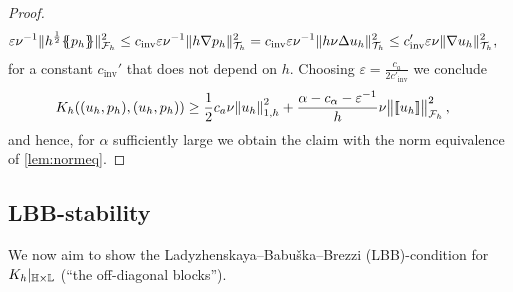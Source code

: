 \documentclass[pdflatex,sn-mathphys,Numbered]{sn-jnl}%
\theoremstyle{remark}%
\theoremstyle{definition}%
\begin{document}
\begin{proof}
\begin{align*}
    \varepsilon \nu^{-1} \Vert h^{\frac12} \{\!\!\{ p_h\}\!\!\} \Vert_{{\mathcal{F}_h}}^2  &\leq c_{\text{inv}} \varepsilon \nu^{-1} \Vert  h \nabla p_h \Vert_{{\mathcal{T}_h}}^2 = c_{\text{inv}} \varepsilon \nu^{-1}  \Vert  h \nu \Delta u_h \Vert_{{\mathcal{T}_h}}^2 \leq c_{\text{inv}}' \varepsilon \nu \Vert \nabla u_h \Vert_{{\mathcal{T}_h}}^2,
  \end{align*} 
  for a constant $c_{\text{inv}}'$ that does not depend on $h$. Choosing $\varepsilon = \frac{c_a}{2 c'_{\text{inv}}}$ we conclude
  \begin{align*}
    K_h((u_h,p_h),(u_h,p_h)) & \geq \frac12 c_a \nu  \norm{u_h}_{1,h}^2 + \frac{\alpha - c_\alpha - \varepsilon^{-1}}{h} \nu \norm{[\![u_h]\!]}_{{\mathcal{F}_h}}^2,
  \end{align*}
  and hence, for $\alpha$ sufficiently large we obtain the claim with the norm equivalence of \cref{lem:normeq}.
\end{proof}

\subsection{LBB-stability}
We now aim to show the Ladyzhenskaya–Babuška–Brezzi (LBB)-condition for $K_h|_{\mathbb{H} \times \mathbb{L}}$ (``the off-diagonal blocks'').
\end{document}
